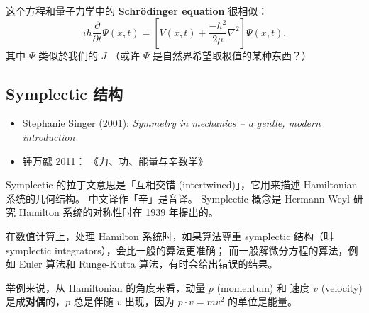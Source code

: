 \documentclass[orivec]{llncs}
\newcommand{\emp}[1]{\textbf{\textcolor{Cerulean}{#1}}}
\begin{document}
这个方程和量子力学中的 \emp{Schr\"{o}dinger equation} 很相似：
\begin{equation}
i \hbar \frac{\partial}{\partial t} \Psi(x,t) = \left[ V(x,t) + \frac{-\hbar^2}{2\mu} \nabla^2 \right] \Psi(x,t).
\end{equation}
其中 $\Psi$ 类似於我们的 $J$ （或许 $\Psi$ 是自然界希望取极值的某种东西？）

\subsection{Symplectic 结构}

\begin{itemize}
\item Stephanie Singer (2001): \textit{Symmetry in mechanics -- a gentle, modern introduction}
\item 锺万勰 2011： 《力、功、能量与辛数学》
\end{itemize}

Symplectic 的拉丁文意思是「互相交错 (intertwined)」，它用来描述 Hamiltonian 系统的几何结构。 中文译作「辛」是音译。  Symplectic 概念是 Hermann Weyl 研究 Hamilton 系统的对称性时在 1939 年提出的。

在数值计算上，处理 Hamilton 系统时，如果算法尊重 symplectic 结构（叫 symplectic integrators），会比一般的算法更准确； 而一般解微分方程的算法，例如 Euler 算法和 Runge-Kutta 算法，有时会给出错误的结果。

举例来说，从 Hamiltonian 的角度来看，动量 $p$ (momentum) 和 速度 $v$ (velocity) 是成\emp{对偶}的，$p$ 总是伴随 $v$ 出现，因为 $p \cdot v = mv^2$ 的单位是能量。
\end{document}
